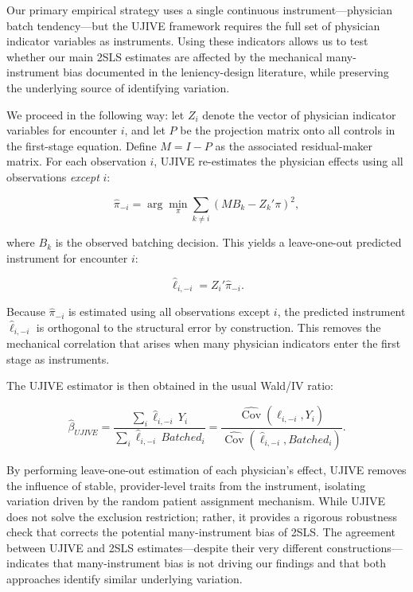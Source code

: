 \documentclass[11pt]{article}
\newcommand{\1}{\hbox{\rm 1\kern-.35em 1}}
\begin{document}
Our primary empirical strategy uses a single continuous instrument---physician batch tendency---but the UJIVE framework requires the full set of physician indicator variables as instruments. Using these indicators allows us to test whether our main 2SLS estimates are affected by the mechanical many-instrument bias documented in the leniency-design literature, while preserving the underlying source of identifying variation.

We proceed in the following way: let $Z_i$ denote the vector of physician indicator variables for encounter $i$, and let $P$ be the projection matrix onto all controls in the first-stage equation. Define $M = I - P$ as the associated residual-maker matrix. For each observation $i$, UJIVE re-estimates the physician effects using all observations \emph{except} $i$:

\begin{equation}
\hat{\pi}_{-i}
=
\arg\min_{\pi}
\sum_{k \neq i}
\left( M B_k - Z_k' \pi \right)^2,
\label{eq:ujive_firststage}
\end{equation}

where $B_k$ is the observed batching decision. This yields a leave-one-out predicted instrument for encounter $i$:

\begin{equation}
\hat{\ell}_{i,-i} = Z_i' \hat{\pi}_{-i}.
\label{eq:ujive_prediction}
\end{equation}

Because $\hat{\pi}_{-i}$ is estimated using all observations except $i$, the predicted instrument $\hat{\ell}_{i,-i}$ is orthogonal to the structural error by construction. This removes the mechanical correlation that arises when many physician indicators enter the first stage as instruments.

The UJIVE estimator is then obtained in the usual Wald/IV ratio:

\begin{equation}
\hat{\beta}_{UJIVE}
=
\frac{\sum_{i} \hat{\ell}_{i,-i} \, Y_i}
     {\sum_{i} \hat{\ell}_{i,-i} \, Batched_i}
=
\frac{\widehat{\operatorname{Cov}}(\hat{\ell}_{i,-i},Y_i)}
     {\widehat{\operatorname{Cov}}(\hat{\ell}_{i,-i},Batched_i)}.
\label{eq:ujive_wald}
\end{equation}

By performing leave-one-out estimation of each physician’s effect, UJIVE removes the influence of stable, provider-level traits from the instrument, isolating variation driven by the random patient assignment mechanism. While UJIVE does not solve the exclusion restriction; rather, it provides a rigorous robustness check that corrects the potential many-instrument bias of 2SLS. The agreement between UJIVE and 2SLS estimates—despite their very different constructions—indicates that many-instrument bias is not driving our findings and that both approaches identify similar underlying variation.
\end{document}
